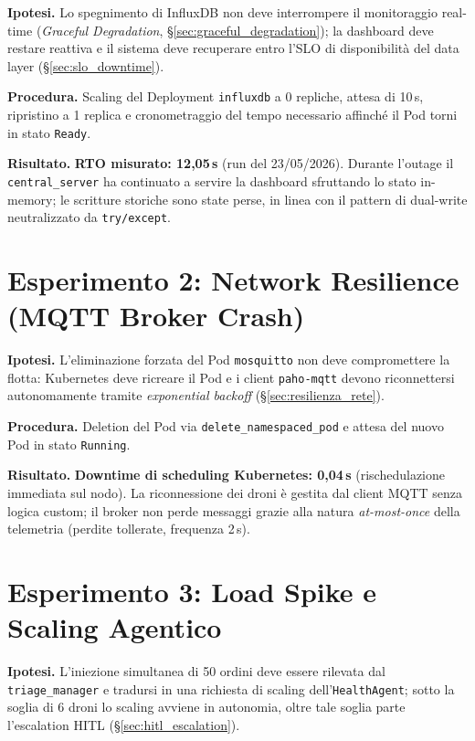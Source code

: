 \textbf{Ipotesi.} Lo spegnimento di InfluxDB non deve interrompere il monitoraggio real-time (\textit{Graceful Degradation}, §\ref{sec:graceful_degradation}); la dashboard deve restare reattiva e il sistema deve recuperare entro l'SLO di disponibilità del data layer (§\ref{sec:slo_downtime}).

\textbf{Procedura.} Scaling del Deployment \texttt{influxdb} a 0 repliche, attesa di 10\,s, ripristino a 1 replica e cronometraggio del tempo necessario affinché il Pod torni in stato \texttt{Ready}.

\textbf{Risultato.} \textbf{RTO misurato: 12{,}05\,s} (run del 23/05/2026). Durante l'outage il \texttt{central\_server} ha continuato a servire la dashboard sfruttando lo stato in-memory; le scritture storiche sono state perse, in linea con il pattern di dual-write neutralizzato da \texttt{try/except}.

\section{Esperimento 2: Network Resilience (MQTT Broker Crash)}
\label{sec:esperimento_2_mqtt}

\textbf{Ipotesi.} L'eliminazione forzata del Pod \texttt{mosquitto} non deve compromettere la flotta: Kubernetes deve ricreare il Pod e i client \texttt{paho-mqtt} devono riconnettersi autonomamente tramite \textit{exponential backoff} (§\ref{sec:resilienza_rete}).

\textbf{Procedura.} Deletion del Pod via \texttt{delete\_namespaced\_pod} e attesa del nuovo Pod in stato \texttt{Running}.

\textbf{Risultato.} \textbf{Downtime di scheduling Kubernetes: 0{,}04\,s} (rischedulazione immediata sul nodo). La riconnessione dei droni è gestita dal client MQTT senza logica custom; il broker non perde messaggi grazie alla natura \textit{at-most-once} della telemetria (perdite tollerate, frequenza 2\,s).

\section{Esperimento 3: Load Spike e Scaling Agentico}
\label{sec:esperimento_3_load}

\textbf{Ipotesi.} L'iniezione simultanea di 50 ordini deve essere rilevata dal \texttt{triage\_manager} e tradursi in una richiesta di scaling dell'\texttt{HealthAgent}; sotto la soglia di 6 droni lo scaling avviene in autonomia, oltre tale soglia parte l'escalation HITL (§\ref{sec:hitl_escalation}).

